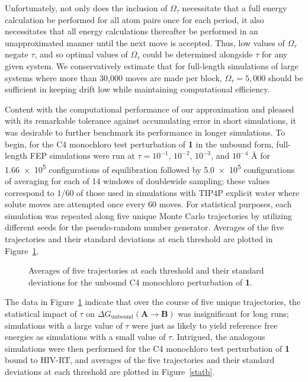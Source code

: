 \documentclass[12pt]{report}
\def\figlab{Figure}\def\figslab{\figlab s}
\newcommand*\fig[1]{\figlab~\ref{#1}}
\begin{document}
Unfortunately, not only does the inclusion of $\Omega_\tau$ necessitate that a full energy calculation be performed for all atom pairs once for each period, it also necessitates that all energy calculations thereafter be performed in an unapproximated manner until the next move is accepted. Thus, low values of $\Omega_\tau$ negate $\tau$, and so optimal values of $\Omega_\tau$ could be determined alongside $\tau$ for any given system. We conservatively estimate that for full-length simulations of large systems where more than 30,000 moves are made per block, $\Omega_\tau = 5,000$ should be sufficient in keeping drift low while maintaining computational efficiency.

Content with the computational performance of our approximation and pleased with its remarkable tolerance against accumulating error in short simulations, it was desirable to further benchmark its performance in longer simulations. To begin, for the C4 monochloro test perturbation of \textbf{1} in the unbound form, full-length FEP simulations were run at $\tau = 10^{-1}$, $10^{-2}$, $10^{-3}$, and $10^{-4}$ \AA{} for \num{1.66e5} configurations of equilibration followed by \num{5.0e5} configurations of averaging for each of 14 windows of doublewide sampling; these values correspond to 1/60 of those used in simulations with TIP4P explicit water where solute moves are attempted once every 60 moves. For statistical purposes, each simulation was repeated along five unique Monte Carlo trajectories by utilizing different seeds for the pseudo-random number generator. Averages of the five trajectories and their standard deviations at each threshold are plotted in \fig{statun}.

\begin{figure}[htbp]
\centering

\caption{Averages of five trajectories at each threshold and their standard deviations for the unbound C4 monochloro perturbation of \textbf{1}.}
\label{statun}
\end{figure}

The data in \fig{statun} indicate that over the course of five unique trajectories, the statistical impact of $\tau$ on 
$\Delta G_{\textrm{unbound}}(\textbf{A} \longrightarrow \textbf{B})$ was insignificant for long runs; simulations with a large value of $\tau$ were just as likely to yield reference free energies as simulations with a small value of $\tau$. Intrigued, the analogous simulations were then performed for the C4 monochloro test perturbation of \textbf{1} bound to HIV-RT, and averages of the five trajectories and their standard deviations at each threshold are plotted in \fig{statb}.
\end{document}
